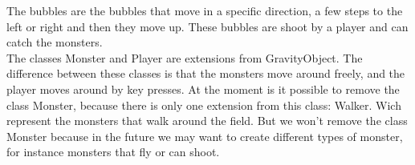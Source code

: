 The bubbles are the bubbles that move in a specific direction, a few steps to the left or right and then they move up. These bubbles are shoot by a player and can catch the monsters.\\
The classes Monster and Player are extensions from GravityObject. The difference between these classes is that the monsters move around freely, and the player moves around by key presses. At the moment is it possible to remove the class Monster, because there is only one extension from this class: Walker. Wich represent the monsters that walk around the field. But we won't remove the class Monster because in the future we may want to create different types of monster, for instance monsters that fly or can shoot.